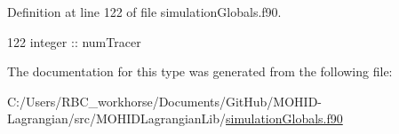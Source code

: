 Definition at line 122 of file simulation\+Globals.\+f90.


\begin{DoxyCode}
122         \textcolor{keywordtype}{integer} :: numTracer
\end{DoxyCode}


The documentation for this type was generated from the following file\+:\begin{DoxyCompactItemize}
\item 
C\+:/\+Users/\+R\+B\+C\+\_\+workhorse/\+Documents/\+Git\+Hub/\+M\+O\+H\+I\+D-\/\+Lagrangian/src/\+M\+O\+H\+I\+D\+Lagrangian\+Lib/\mbox{\hyperlink{simulation_globals_8f90}{simulation\+Globals.\+f90}}\end{DoxyCompactItemize}
